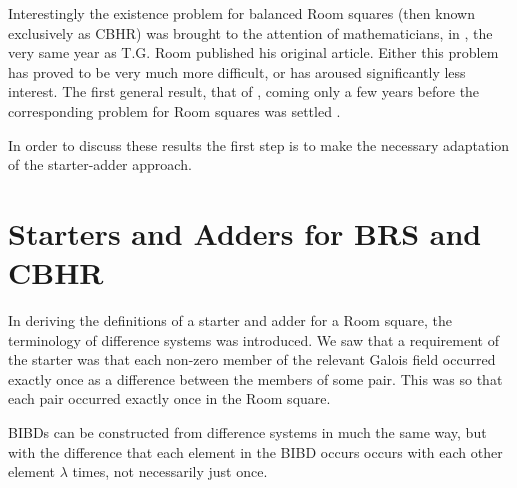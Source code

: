 \documentclass[11pt, a4paper]{book}\usepackage[]{graphicx}\usepackage[]{xcolor}
\begin{document}
Interestingly the existence problem for balanced Room
squares (then known exclusively as CBHR) was brought to the
attention of mathematicians, in
\cite{parkerBalancedHowellRotations1955},
the
very same year as T.G. Room published his original article.
Either this problem has proved to be very much more
difficult, or has aroused significantly less interest.  The
first general result, that of
\cite{hwangMoreContributionsConstructing1970},
coming only a
few years before the corresponding problem for Room squares
was settled
\cite{wallisExistenceRoomSquares1973}.

In order to discuss these results the first step is to make
the necessary adaptation of the starter-adder approach.

\section{Starters and Adders for BRS and CBHR}

In deriving the definitions of a starter and adder for a
Room square, the terminology of difference systems was
introduced. We saw that a requirement of the starter was
that each non-zero member of the relevant Galois field
occurred exactly once as a difference between the members of
some pair. This was so that each pair occurred exactly once
in the Room square.

BIBDs can be constructed from difference systems in much the
same way, but with the difference that each element in the
BIBD occurs occurs with each other element $\lambda$ times,
not necessarily just once.
\end{document}
